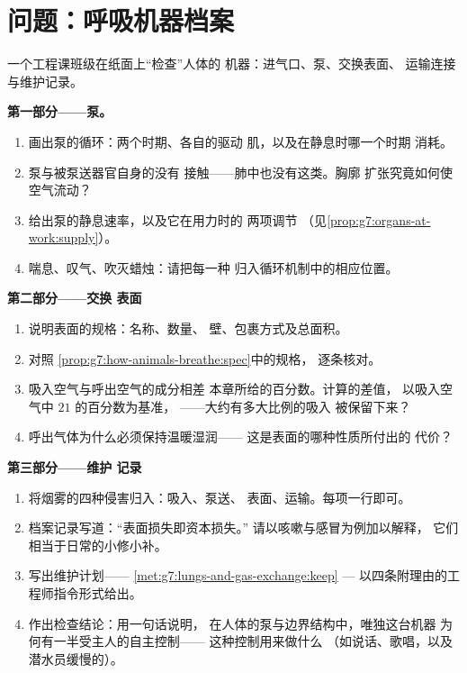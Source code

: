 \section{问题：呼吸机器档案}

\begin{problem}\label{pb:g7:lungs-and-gas-exchange:1}
一个工程课班级在纸面上“检查”人体的
机器：进气口、泵、交换表面、
运输连接与维护记录。

\medskip\noindent\textbf{第一部分——泵。}
\begin{enumerate}
  \item 画出泵的循环：两个时期、各自的驱动
        肌，以及在静息时哪一个时期
        消耗。
  \item 泵与被泵送器官自身的没有
        接触——肺中也没有这类。胸廓
        扩张究竟如何使空气流动？
  \item 给出泵的静息速率，以及它在用力时的
        两项调节
        （见\cref{prop:g7:organs-at-work:supply}）。
  \item 喘息、叹气、吹灭蜡烛：请把每一种
        归入循环机制中的相应位置。
\end{enumerate}

\medskip\noindent\textbf{第二部分——交换
表面}
\begin{enumerate}[resume]
  \item 说明表面的规格：名称、数量、
        壁、包裹方式及总面积。
  \item 对照
        \cref{prop:g7:how-animals-breathe:spec}中的规格，
        逐条核对。
  \item 吸入空气与呼出空气的成分相差
        本章所给的百分数。计算的差值，
        以吸入空气中 $21$ 的百分数为基准，
——大约有多大比例的吸入
        被保留下来？
  \item 呼出气体为什么必须保持温暖湿润——
        这是表面的哪种性质所付出的
        代价？
\end{enumerate}

\medskip\noindent\textbf{第三部分——维护
记录}
\begin{enumerate}[resume]
  \item 将烟雾的四种侵害归入：吸入、泵送、
        表面、运输。每项一行即可。
  \item 档案记录写道：“表面损失即资本损失。”
        请以咳嗽与感冒为例加以解释，
        它们相当于日常的小修小补。
  \item 写出维护计划——
        \cref{met:g7:lungs-and-gas-exchange:keep} ---
        以四条附理由的工程师指令形式给出。
  \item 作出检查结论：用一句话说明，
        在人体的泵与边界结构中，唯独这台机器
        为何有一半受主人的自主控制——
        这种控制用来做什么
        （如说话、歌唱，以及潜水员缓慢的）。
\end{enumerate}
\end{problem}
